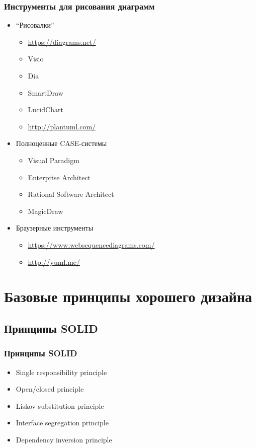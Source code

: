 \documentclass{../../slides-style}
\begin{document}
    \begin{frame}
        \frametitle{Инструменты для рисования диаграмм}
        \begin{itemize}
            \item \enquote{Рисовалки}
            \begin{itemize}
                \item \url{https://diagrams.net/}
                \item Visio
                \item Dia
                \item SmartDraw
                \item LucidChart
                \item \url{http://plantuml.com/}
            \end{itemize}
            \item Полноценные CASE-системы
            \begin{itemize}
                \item Visual Paradigm
                \item Enterprise Architect
                \item Rational Software Architect
                \item MagicDraw
            \end{itemize}
            \item Браузерные инструменты
            \begin{itemize}
                \item \url{https://www.websequencediagrams.com/}
                \item \url{http://yuml.me/}
            \end{itemize}
        \end{itemize}
    \end{frame}

    \section{Базовые принципы хорошего дизайна}

    \subsection{Принципы SOLID}

    \begin{frame}
        \frametitle{Принципы SOLID}
        \begin{itemize}
            \item Single responsibility principle
            \item Open/closed principle
            \item Liskov substitution principle
            \item Interface segregation principle
            \item Dependency inversion principle
        \end{itemize}
    \end{frame}
\end{document}

